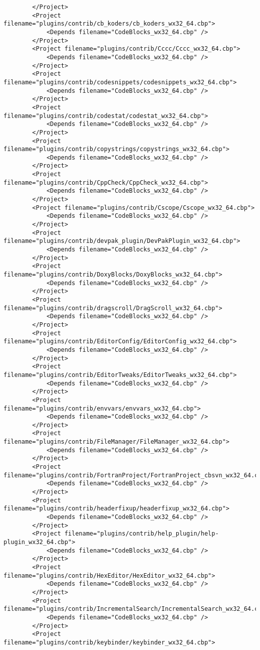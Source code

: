 {\begin{verbatim}
		</Project>
		<Project filename="plugins/contrib/cb_koders/cb_koders_wx32_64.cbp">
			<Depends filename="CodeBlocks_wx32_64.cbp" />
		</Project>
		<Project filename="plugins/contrib/Cccc/Cccc_wx32_64.cbp">
			<Depends filename="CodeBlocks_wx32_64.cbp" />
		</Project>
		<Project filename="plugins/contrib/codesnippets/codesnippets_wx32_64.cbp">
			<Depends filename="CodeBlocks_wx32_64.cbp" />
		</Project>
		<Project filename="plugins/contrib/codestat/codestat_wx32_64.cbp">
			<Depends filename="CodeBlocks_wx32_64.cbp" />
		</Project>
		<Project filename="plugins/contrib/copystrings/copystrings_wx32_64.cbp">
			<Depends filename="CodeBlocks_wx32_64.cbp" />
		</Project>
		<Project filename="plugins/contrib/CppCheck/CppCheck_wx32_64.cbp">
			<Depends filename="CodeBlocks_wx32_64.cbp" />
		</Project>
		<Project filename="plugins/contrib/Cscope/Cscope_wx32_64.cbp">
			<Depends filename="CodeBlocks_wx32_64.cbp" />
		</Project>
		<Project filename="plugins/contrib/devpak_plugin/DevPakPlugin_wx32_64.cbp">
			<Depends filename="CodeBlocks_wx32_64.cbp" />
		</Project>
		<Project filename="plugins/contrib/DoxyBlocks/DoxyBlocks_wx32_64.cbp">
			<Depends filename="CodeBlocks_wx32_64.cbp" />
		</Project>
		<Project filename="plugins/contrib/dragscroll/DragScroll_wx32_64.cbp">
			<Depends filename="CodeBlocks_wx32_64.cbp" />
		</Project>
		<Project filename="plugins/contrib/EditorConfig/EditorConfig_wx32_64.cbp">
			<Depends filename="CodeBlocks_wx32_64.cbp" />
		</Project>
		<Project filename="plugins/contrib/EditorTweaks/EditorTweaks_wx32_64.cbp">
			<Depends filename="CodeBlocks_wx32_64.cbp" />
		</Project>
		<Project filename="plugins/contrib/envvars/envvars_wx32_64.cbp">
			<Depends filename="CodeBlocks_wx32_64.cbp" />
		</Project>
		<Project filename="plugins/contrib/FileManager/FileManager_wx32_64.cbp">
			<Depends filename="CodeBlocks_wx32_64.cbp" />
		</Project>
 		<Project filename="plugins/contrib/FortranProject/FortranProject_cbsvn_wx32_64.cbp">
			<Depends filename="CodeBlocks_wx32_64.cbp" />
		</Project>
		<Project filename="plugins/contrib/headerfixup/headerfixup_wx32_64.cbp">
			<Depends filename="CodeBlocks_wx32_64.cbp" />
		</Project>
		<Project filename="plugins/contrib/help_plugin/help-plugin_wx32_64.cbp">
			<Depends filename="CodeBlocks_wx32_64.cbp" />
		</Project>
		<Project filename="plugins/contrib/HexEditor/HexEditor_wx32_64.cbp">
			<Depends filename="CodeBlocks_wx32_64.cbp" />
		</Project>
		<Project filename="plugins/contrib/IncrementalSearch/IncrementalSearch_wx32_64.cbp">
			<Depends filename="CodeBlocks_wx32_64.cbp" />
		</Project>
		<Project filename="plugins/contrib/keybinder/keybinder_wx32_64.cbp">

\end{verbatim}}
